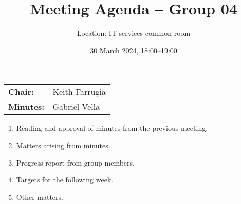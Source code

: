 \documentclass{cce2014-meetings}
\title{Meeting Agenda -- Group 04}
\author{Location: IT services common room}
\date{30 March 2024, 18:00--19:00}
\begin{document}
\maketitle
\begin{center}
        \begin{tabular}{ll}
                \textbf{Chair:}   & Keith Farrugia \\
                \textbf{Minutes:} & Gabriel Vella
        \end{tabular}
\end{center}

\begin{enumerate}

        \item Reading and approval of minutes from the previous meeting.

        \item Matters arising from minutes.

        \item Progress report from group members.

        \item Targets for the following week.

        \item Other matters.

\end{enumerate}
\end{document}
